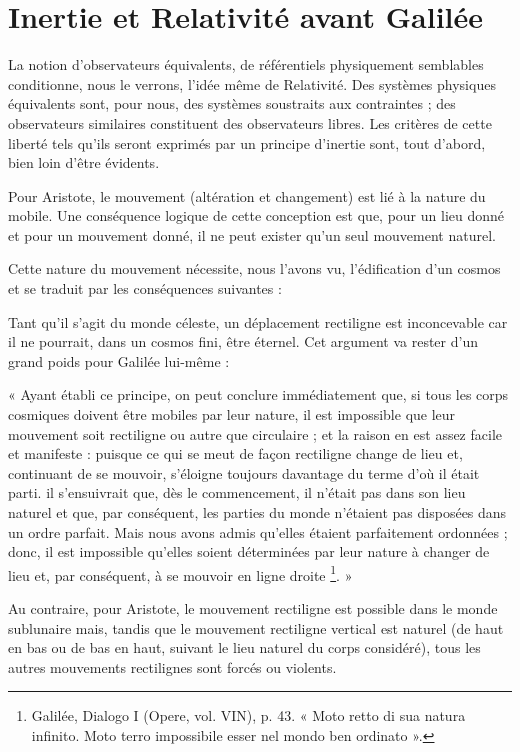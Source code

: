 \section{Inertie et Relativité avant Galilée}

La notion d’observateurs équivalents, de référentiels physiquement
semblables conditionne, nous le verrons, l’idée même de Relativité. Des
systèmes physiques équivalents sont, pour nous, des systèmes soustraits
aux contraintes ; des observateurs similaires constituent des observateurs
libres. Les critères de cette liberté tels qu’ils seront exprimés par un
principe d’inertie sont, tout d’abord, bien loin d’être évidents.

Pour Aristote, le mouvement (altération et changement) est lié à la
nature du mobile. Une conséquence logique de cette conception est que,
pour un lieu donné et pour un mouvement donné, il ne peut exister qu’un
seul mouvement naturel.

Cette nature du mouvement nécessite, nous l’avons vu, l’édification
d’un cosmos et se traduit par les conséquences suivantes :

Tant qu’il s’agit du monde céleste, un déplacement rectiligne est
inconcevable car il ne pourrait, dans un cosmos fini, être éternel. Cet
argument va rester d’un grand poids pour Galilée lui-même :

« Ayant établi ce principe, on peut conclure immédiatement que,
si tous les corps cosmiques doivent être mobiles par leur nature, il est
impossible que leur mouvement soit rectiligne ou autre que circulaire ;
et la raison en est assez facile et manifeste : puisque ce qui se meut de
façon rectiligne change de lieu et, continuant de se mouvoir, s’éloigne
toujours davantage du terme d’où il était parti. il s’ensuivrait que, dès
le commencement, il n’était pas dans son lieu naturel et que, par conséquent,
les parties du monde n'étaient pas disposées dans un ordre parfait.
Mais nous avons admis qu’elles étaient parfaitement ordonnées ; donc,
il est impossible qu’elles soient déterminées par leur nature à changer de
lieu et, par conséquent, à se mouvoir en ligne droite \footnote{Galilée, Dialogo I (Opere, vol. VIN), p. 43. « Moto retto di sua natura
infinito. Moto terro impossibile esser nel mondo ben ordinato ».}. »

Au contraire, pour Aristote, le mouvement rectiligne est possible dans
le monde sublunaire mais, tandis que le mouvement rectiligne vertical est
naturel (de haut en bas ou de bas en haut, suivant le lieu naturel du corps
considéré), tous les autres mouvements rectilignes sont forcés ou violents.


